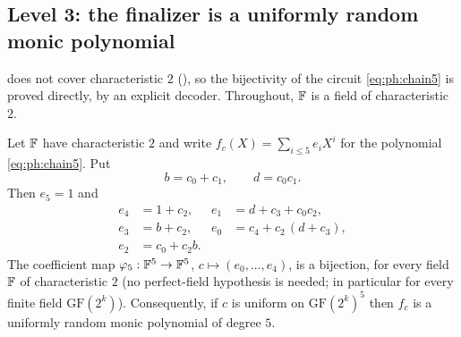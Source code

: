 \subsection{Level 3: the finalizer is a uniformly random monic polynomial}

 does not cover characteristic $2$ (), so the
bijectivity of the circuit \eqref{eq:ph:chain5} is proved directly, by an
explicit decoder.  Throughout, $\mathbb{F}$ is a field of characteristic $2$.

\begin{lemma}\label{lem:ph:chain}
Let $\mathbb{F}$ have characteristic $2$ and write $f_c(X)=\sum_{i\le5}e_iX^i$ for the
polynomial \eqref{eq:ph:chain5}.  Put
\[
  b=c_0+c_1,\qquad d=c_0c_1 .
\]
Then $e_5=1$ and
\begin{equation}\label{eq:ph:chain5-coeffs}
\begin{aligned}
  e_4&=1+c_2, & e_1&=d+c_3+c_0c_2,\\
  e_3&=b+c_2, & e_0&=c_4+c_2\,(d+c_3),\\
  e_2&=c_0+c_2b.
\end{aligned}
\end{equation}
The coefficient map $\varphi_5:\mathbb{F}^5\to\mathbb{F}^5$, $c\mapsto(e_0,\dots,e_4)$, is a
bijection, for every field $\mathbb{F}$ of characteristic $2$ (no perfect-field
hypothesis is needed; in particular for every finite field
$\mathrm{GF}(2^k)$).  Consequently, if $c$ is uniform on $\mathrm{GF}(2^k)^5$
then $f_c$ is a uniformly random monic polynomial of degree $5$.
\end{lemma}
